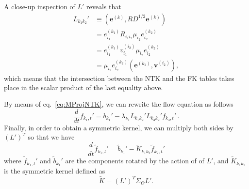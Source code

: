 \documentclass[11pt]{article}
\begin{document}
A close-up inspection of $L'$ reveals that
\begin{equation}
  \begin{split}
    L_{k_1k_2}' & \equiv \left( \pmb{e}^{(k)}, RD^{1/2} \pmb{e}^{(k)} \right) \\
    & = e^{(k_1)}_{i_1} R_{i_1 i_2} \mu_{i_2} e_{i_2}^{(k_2)} \\
    & = e^{(k_1)}_{i_1} v^{(i_2)}_{i_1} \mu_{i_2} e_{i_2}^{(k_2)} \\
    & = \mu_{i_2} e_{i_2}^{(k_2)} (\pmb{e}^{(k_1)}, \pmb{v}^{(i_2)}),
  \end{split}
\end{equation}
which means that the intersection between the NTK and the FK tables takes place in the
scalar product of the last equality above.

By means of eq.~\eqref{eq:MProjNTK}, we can rewrite the flow equation as follows
\begin{equation}
  \frac{d}{dt}f_{k_1,t}' = b_{k_1}' - \lambda_{k_1} L_{k_1 k_2}' L_{k_3 k_2}' f_{k_3,t}' \,.
\end{equation}
Finally, in order to obtain a symmetric kernel, we can multiply both sides by $(L')^T$ so that we have
\begin{equation}
  \frac{d}{dt} \tilde{f}_{k_1,t}' = \tilde{b}_{k_1}' - \tilde{K}_{k_1 k_2} \tilde{f}_{k_2,t}'
  \label{eq:FlowEqSymmetricKernel}
\end{equation}
where $\tilde{f}_{k_1,t}'$ and $\tilde{b}_{k_1}'$ are the components rotated by the action of of
$L'$, and $\tilde{K}_{k_1 k_2}$ is the symmetric kernel defined as
\begin{equation}
  \tilde{K} = (L')^T \Sigma_{\Theta} L' .
  \label{eq:SymmetricKernel}
\end{equation}
\end{document}
